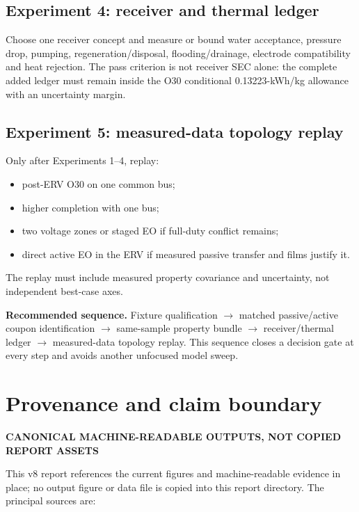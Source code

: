 \documentclass[10pt,a4paper]{article}
\newcommand{\sans}{\fontfamily{qhv}\selectfont}
\newcommand{\eyebrow}[1]{%
  {\sans\bfseries\color{Teal}\MakeUppercase{#1}}\par\vspace{1.5mm}%
}
\begin{document}
\subsection{Experiment 4: receiver and thermal ledger}

Choose one receiver concept and measure or bound water acceptance, pressure
drop, pumping, regeneration/disposal, flooding/drainage, electrode
compatibility and heat rejection. The pass criterion is not receiver SEC
alone: the complete added ledger must remain inside the O30 conditional
0.13223-kWh/kg allowance with an uncertainty margin.

\subsection{Experiment 5: measured-data topology replay}

Only after Experiments 1--4, replay:
\begin{itemize}
  \item post-ERV O30 on one common bus;
  \item higher completion with one bus;
  \item two voltage zones or staged EO if full-duty conflict remains;
  \item direct active EO in the ERV if measured passive transfer and films
        justify it.
\end{itemize}
The replay must include measured property covariance and uncertainty, not
independent best-case axes.

\begin{mainbox}
\textbf{Recommended sequence.} Fixture qualification $\rightarrow$ matched
passive/active coupon identification $\rightarrow$ same-sample property bundle
$\rightarrow$ receiver/thermal ledger $\rightarrow$ measured-data topology
replay. This sequence closes a decision gate at every step and avoids another
unfocused model sweep.
\end{mainbox}

\section{Provenance and claim boundary}
\eyebrow{Canonical machine-readable outputs, not copied report assets}

This v8 report references the current figures and machine-readable evidence
in place; no output figure or data file is copied into this report directory.
The principal sources are:
\end{document}
